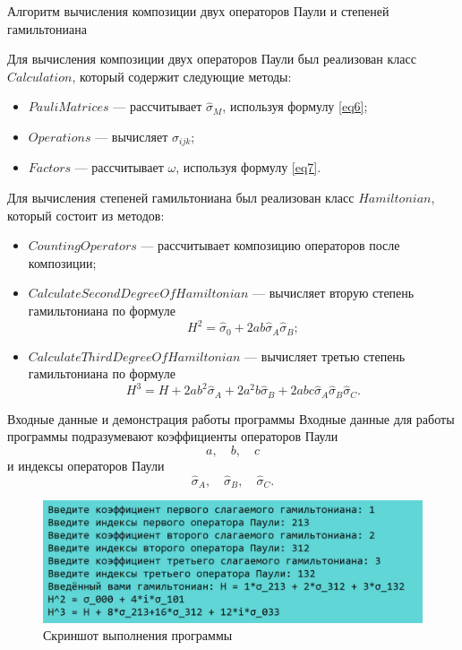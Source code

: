\documentclass[9pt,pdf,hyperref={unicode=true}]{beamer}
\begin{document}

\begin{frame}[t]{Алгоритм вычисления композиции двух операторов Паули и степеней гамильтониана}

Для вычисления композиции двух операторов Паули был реализован класс $Calculation$, который содержит следующие методы:
\begin{itemize}
\item $PauliMatrices$ --- рассчитывает $\hat{\sigma}_M$, используя формулу \eqref{eq6};
\item $Operations$ --- вычисляет $\hat{\sigma}_{ijk}$;
\item $Factors$ --- рассчитывает $\omega$, используя формулу \eqref{eq7}.
\end{itemize}

Для вычисления степеней гамильтониана был реализован класс $Hamiltonian$, который состоит из методов:

\begin{itemize}
\item $CountingOperators$ --- рассчитывает композицию операторов после композиции;
\item $CalculateSecondDegreeOfHamiltonian$ --- вычисляет вторую степень гамильтониана по формуле
$$H^2 = \hat{\sigma}_0 + 2ab \hat{\sigma}_A \hat{\sigma}_B;$$
\item $CalculateThirdDegreeOfHamiltonian$ --- вычисляет третью степень гамильтониана по формуле
 $$H^3 = H + 2ab^2\hat{\sigma}_A + 2a^2b\hat{\sigma}_B + 2abc\hat{\sigma}_A\hat{\sigma}_B\hat{\sigma}_C.$$
\end{itemize}

\end{frame}


\begin{frame}[t]{Входные данные и демонстрация работы программы}
Входные данные для работы программы подразумевают коэффициенты операторов Паули
$$
a, \quad b, \quad c
$$
и индексы операторов Паули
$$
\hat{\sigma}_A, \quad \hat{\sigma}_B, \quad \hat{\sigma}_C.
$$
\begin{figure}[h]
	\centering
	\includegraphics[width=1\linewidth]{screenshot_of_program_execution.pdf}
	\caption{Скриншот выполнения программы}
\end{figure}

\end{frame}
\end{document}
